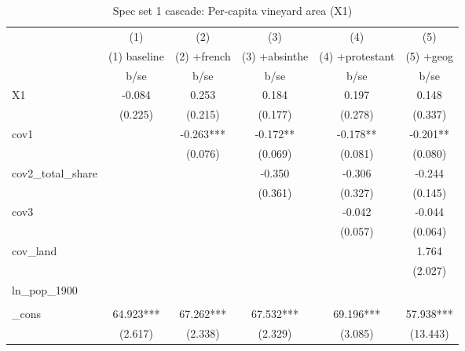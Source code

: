 \begin{table}[htbp]\centering
\def\sym#1{\ifmmode^{#1}\else\(^{#1}\)\fi}
\caption{Spec set 1 cascade: Per-capita vineyard area (X1) \label{tab:cascade1}}
\begin{tabular}{l*{5}{c}}
\toprule
            &\multicolumn{1}{c}{(1)}&\multicolumn{1}{c}{(2)}&\multicolumn{1}{c}{(3)}&\multicolumn{1}{c}{(4)}&\multicolumn{1}{c}{(5)}\\
            &\multicolumn{1}{c}{(1) baseline}&\multicolumn{1}{c}{(2) +french}&\multicolumn{1}{c}{(3) +absinthe}&\multicolumn{1}{c}{(4) +protestant}&\multicolumn{1}{c}{(5) +geog}\\
            &        b/se   &        b/se   &        b/se   &        b/se   &        b/se   \\
\midrule
X1          &      -0.084   &       0.253   &       0.184   &       0.197   &       0.148   \\
            &     (0.225)   &     (0.215)   &     (0.177)   &     (0.278)   &     (0.337)   \\
cov1        &               &      -0.263***&      -0.172** &      -0.178** &      -0.201** \\
            &               &     (0.076)   &     (0.069)   &     (0.081)   &     (0.080)   \\
cov2\_total\_share&               &               &      -0.350   &      -0.306   &      -0.244   \\
            &               &               &     (0.361)   &     (0.327)   &     (0.145)   \\
cov3        &               &               &               &      -0.042   &      -0.044   \\
            &               &               &               &     (0.057)   &     (0.064)   \\
cov\_land    &               &               &               &               &       1.764   \\
            &               &               &               &               &     (2.027)   \\
ln\_pop\_1900 &               &               &               &               &               \\
            &               &               &               &               &               \\
\_cons      &      64.923***&      67.262***&      67.532***&      69.196***&      57.938***\\
            &     (2.617)   &     (2.338)   &     (2.329)   &     (3.085)   &    (13.443)   \\

\end{tabular}
\end{table}
